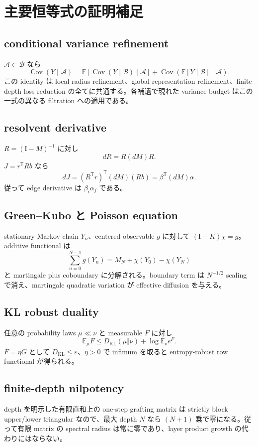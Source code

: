 \documentclass[11pt,a4paper,openany]{book}
\numberwithin{equation}{chapter}
\newcommand{\E}{\mathbb E}
\newcommand{\Cov}{\operatorname{Cov}}
\newcommand{\KL}{D_{\mathrm{KL}}}
\newcommand{\cA}{\mathcal A}
\newcommand{\cB}{\mathcal B}
\newcommand{\Id}{\mathrm I}
\begin{document}
\chapter{主要恒等式の証明補足}
\section{conditional variance refinement}
$\cA\subset\cB$ なら
\[
\Cov(Y\mid\cA)
=\E[\Cov(Y\mid\cB)\mid\cA]
+\Cov(\E[Y\mid\cB]\mid\cA).
\]
この identity は local radius refinement、global representation refinement、finite-depth loss reduction の全てに共通する。各補遺で現れた variance budget はこの一式の異なる filtration への適用である。

\section{resolvent derivative}
$R=(\Id-M)^{-1}$ に対し
\[
dR=R(dM)R.
\]
$J=r^{\mathsf T}Rb$ なら
\[
dJ=(R^{\mathsf T}r)^{\mathsf T}(dM)(Rb)
=\beta^{\mathsf T}(dM)\alpha.
\]
従って edge derivative は $\beta_i\alpha_j$ である。

\section{Green--Kubo と Poisson equation}
stationary Markov chain $Y_n$、centered observable $g$ に対して $(\Id-K)\chi=g$。additive functional は
\[
\sum_{n=0}^{N-1}g(Y_n)
=M_N+\chi(Y_0)-\chi(Y_N)
\]
と martingale plus coboundary に分解される。boundary term は $N^{-1/2}$ scaling で消え、martingale quadratic variation が effective diffusion を与える。

\section{KL robust duality}
任意の probability laws $\mu\ll\nu$ と measurable $F$ に対し
\[
\E_\mu F
\le\KL(\mu\Vert\nu)+\log\E_\nu e^F.
\]
$F=\eta G$ として $\KL\le\varepsilon$、$\eta>0$ で infimum を取ると entropy-robust row functional が得られる。

\section{finite-depth nilpotency}
depth を明示した有限直和上の one-step grafting matrix は strictly block upper/lower triangular なので、最大 depth $N$ なら $(N+1)$ 乗で零になる。従って有限 matrix の spectral radius は常に零であり、layer product growth の代わりにはならない。
\end{document}
